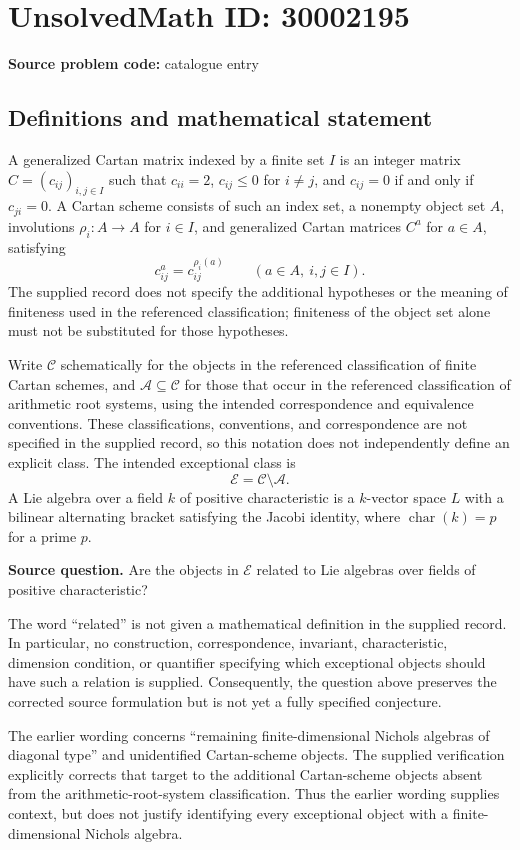 \documentclass[11pt]{article}
\begin{document}
\section*{UnsolvedMath ID: 30002195}
\textbf{Source problem code:} catalogue entry
\subsection{Definitions and mathematical statement}
A generalized Cartan matrix indexed by a finite set \(I\) is an integer matrix \(C=(c_{ij})_{i,j\in I}\) such that \(c_{ii}=2\), \(c_{ij}\leq 0\) for \(i\ne j\), and \(c_{ij}=0\) if and only if \(c_{ji}=0\). A Cartan scheme consists of such an index set, a nonempty object set \(A\), involutions \(\rho_i:A\to A\) for \(i\in I\), and generalized Cartan matrices \(C^a\) for \(a\in A\), satisfying
\[
 c^a_{ij}=c^{\rho_i(a)}_{ij}\qquad(a\in A,\ i,j\in I).
\]
The supplied record does not specify the additional hypotheses or the meaning of finiteness used in the referenced classification; finiteness of the object set alone must not be substituted for those hypotheses.

Write \(\mathcal C\) schematically for the objects in the referenced classification of finite Cartan schemes, and \(\mathcal A\subseteq\mathcal C\) for those that occur in the referenced classification of arithmetic root systems, using the intended correspondence and equivalence conventions. These classifications, conventions, and correspondence are not specified in the supplied record, so this notation does not independently define an explicit class. The intended exceptional class is
\[
\mathcal E=\mathcal C\setminus\mathcal A.
\]
A Lie algebra over a field \(k\) of positive characteristic is a \(k\)-vector space \(L\) with a bilinear alternating bracket satisfying the Jacobi identity, where \(\operatorname{char}(k)=p\) for a prime \(p\).

\textbf{Source question.} Are the objects in \(\mathcal E\) related to Lie algebras over fields of positive characteristic?

The word ``related'' is not given a mathematical definition in the supplied record. In particular, no construction, correspondence, invariant, characteristic, dimension condition, or quantifier specifying which exceptional objects should have such a relation is supplied. Consequently, the question above preserves the corrected source formulation but is not yet a fully specified conjecture.

The earlier wording concerns ``remaining finite-dimensional Nichols algebras of diagonal type'' and unidentified Cartan-scheme objects. The supplied verification explicitly corrects that target to the additional Cartan-scheme objects absent from the arithmetic-root-system classification. Thus the earlier wording supplies context, but does not justify identifying every exceptional object with a finite-dimensional Nichols algebra.
\end{document}

